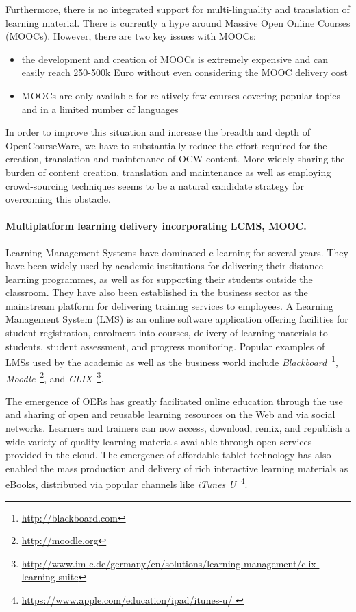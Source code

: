 \documentclass[ngerman,UKenglish,table]{scrbook}
\begin{document}
Furthermore, there is no integrated support for multi-linguality and translation of learning material.
There is currently a hype around Massive Open Online Courses (MOOCs).
However, there are two key issues with MOOCs:
\begin{itemize}
\item the development and creation of MOOCs is extremely expensive and can easily reach 250-500k Euro without even considering the MOOC delivery cost
\item MOOCs are only available for relatively few courses covering popular topics and in a limited number of languages
\end{itemize}

In order to improve this situation and increase the breadth and depth of OpenCourseWare, we have to substantially reduce the effort required for the creation, translation and maintenance of OCW content.
More widely sharing the burden of content creation, translation and maintenance as well as employing crowd-sourcing techniques seems to be a natural candidate strategy for overcoming this obstacle.

\paragraph{Multiplatform learning delivery incorporating LCMS, MOOC.}
Learning Management Systems have dominated e-learning for several years.
They have been widely used by academic institutions for delivering their distance learning programmes, as well as for supporting their students outside the classroom.
They have also been established in the business sector as the mainstream platform for delivering training services to employees.
A Learning Management System (LMS) is an online software application offering facilities for student registration, enrolment into courses, delivery of learning materials to students, student assessment, and progress monitoring.
Popular examples of LMSs used by the academic as well as the business world include \emph{Blackboard}~\footnote{\url{http://blackboard.com}}, \emph{Moodle}~\footnote{\url{http://moodle.org}}, and \emph{CLIX}~\footnote{\url{http://www.im-c.de/germany/en/solutions/learning-management/clix-learning-suite}}.

The emergence of OERs has greatly facilitated online education through the use and sharing of open and reusable learning resources on the Web and via social networks.
Learners and trainers can now access, download, remix, and republish a wide variety of quality learning materials available through open services provided in the cloud.
The emergence of affordable tablet technology has also enabled the mass production and delivery of rich interactive learning materials as eBooks, distributed via popular channels like \emph{iTunes U}~\footnote{\url{https://www.apple.com/education/ipad/itunes-u/ }}.
\end{document}
